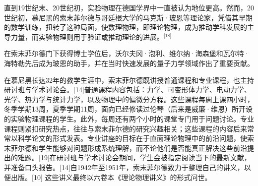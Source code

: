 直到19世纪末、20世纪初，实验物理在德国学界中一直被认为地位更高。然而，20世纪初，慕尼黑的索末菲尔德与哥廷根大学的马克斯·玻恩等理论家，凭借其早期的数学训练，扭转了这种局面，使数理物理，即理论物理，成为推动学科发展的主导力量，而实验物理则用于验证或推动理论的进展。\(^\text{[18]}\)

在索末菲尔德门下获得博士学位后，沃尔夫冈·泡利、维尔纳·海森堡和瓦尔特·海特勒先后成为玻恩的助手，并在当时快速发展的量子力学领域作出了重要贡献。

在慕尼黑长达32年的教学生涯中，索末菲尔德既讲授普通课程和专业课程，也主持研讨班与学术讨论会。[14]普通课程内容包括：力学、可变形体力学、电动力学、光学、热力学与统计力学，以及物理中的偏微分方程。这些课程每周上课四小时，冬季学期13周，夏季学期11周，面向已经修读过伦琴（后来是威廉·维恩）所开设的实验物理课程的学生。此外，每周还有两个小时的课堂专门用于问题讨论。专业课程则紧扣研究热点，往往与索末菲尔德的研究兴趣相关；这些课程的内容后来常常以科学论文的形式发表。专业讲座的目标在于直面理论物理中的前沿问题，使索末菲尔德和学生能够对问题形成系统理解，而不论他们是否能真正解决这些前沿提出的难题。[19]在研讨班与学术讨论会期间，学生会被指定阅读当下的最新文献，并准备口头报告。[14]自1942年至1951年，索末菲尔德致力于整理自己的讲义，以便出版。[10] 这些讲义最终以六卷本《理论物理讲义》的形式问世。
